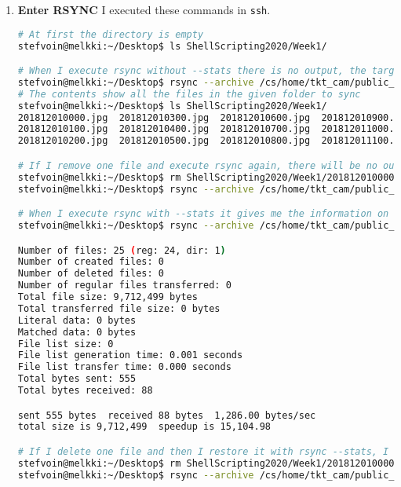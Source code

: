 \documentclass[9pt]{article}
\begin{document}
\begin{enumerate}
	\item \textbf{Enter RSYNC}
		I executed these commands in \texttt{ssh}.
		\begin{lstlisting}[language=bash,breaklines=true]
# At first the directory is empty
stefvoin@melkki:~/Desktop$ ls ShellScripting2020/Week1/

# When I execute rsync without --stats there is no output, the target directory is just populated
stefvoin@melkki:~/Desktop$ rsync --archive /cs/home/tkt_cam/public_html/2018/12/01/ ShellScripting2020/Week1/
# The contents show all the files in the given folder to sync
stefvoin@melkki:~/Desktop$ ls ShellScripting2020/Week1/
201812010000.jpg  201812010300.jpg  201812010600.jpg  201812010900.jpg  201812011200.jpg  201812011500.jpg  201812011800.jpg  201812012100.jpg
201812010100.jpg  201812010400.jpg  201812010700.jpg  201812011000.jpg  201812011300.jpg  201812011600.jpg  201812011900.jpg  201812012200.jpg
201812010200.jpg  201812010500.jpg  201812010800.jpg  201812011100.jpg  201812011400.jpg  201812011700.jpg  201812012000.jpg  201812012300.jpg

# If I remove one file and execute rsync again, there will be no output, the missing file will just be restored
stefvoin@melkki:~/Desktop$ rm ShellScripting2020/Week1/201812010000.jpg 
stefvoin@melkki:~/Desktop$ rsync --archive /cs/home/tkt_cam/public_html/2018/12/01/ ShellScripting2020/Week1/

# When I execute rsync with --stats it gives me the information on the difference between the two directories
stefvoin@melkki:~/Desktop$ rsync --archive /cs/home/tkt_cam/public_html/2018/12/01/ ShellScripting2020/Week1/ --stats

Number of files: 25 (reg: 24, dir: 1)
Number of created files: 0
Number of deleted files: 0
Number of regular files transferred: 0
Total file size: 9,712,499 bytes
Total transferred file size: 0 bytes
Literal data: 0 bytes
Matched data: 0 bytes
File list size: 0
File list generation time: 0.001 seconds
File list transfer time: 0.000 seconds
Total bytes sent: 555
Total bytes received: 88

sent 555 bytes  received 88 bytes  1,286.00 bytes/sec
total size is 9,712,499  speedup is 15,104.98

# If I delete one file and then I restore it with rsync --stats, I can see that it tells me the information about the operation
stefvoin@melkki:~/Desktop$ rm ShellScripting2020/Week1/201812010000.jpg 
stefvoin@melkki:~/Desktop$ rsync --archive /cs/home/tkt_cam/public_html/2018/12/01/ ShellScripting2020/Week1/ --stats


\end{lstlisting}
\end{enumerate}
\end{document}
